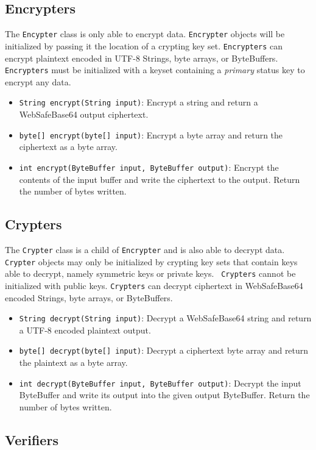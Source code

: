 \documentclass{llncs}
\begin{document}
\subsection{Encrypters}

The {\tt Encypter} class is only able to encrypt data. {\tt Encrypter} objects
will be initialized by passing it the location of a crypting key set.
{\tt Encrypters} can encrypt plaintext encoded in UTF-8 Strings, byte arrays, or
ByteBuffers. {\tt Encrypters} must be initialized with a keyset containing a
{\it primary} status key to encrypt any data.
\begin{itemize}
  \item {\tt String encrypt(String input)}: Encrypt a string and return a
  WebSafeBase64 output ciphertext.
  \item {\tt byte[] encrypt(byte[] input)}: Encrypt a byte array and return the
  ciphertext as a byte array.
  \item {\tt int encrypt(ByteBuffer input, ByteBuffer output)}: Encrypt the
  contents of the input buffer and write the ciphertext to the output. Return
  the number of bytes written.
\end{itemize}

\subsection{Crypters}

The {\tt Crypter} class is a child of {\tt Encrypter} and is also able to
decrypt data. {\tt Crypter} objects may only be initialized by crypting key sets
that contain keys able to decrypt, namely symmetric keys or private keys. {\tt
Crypters} cannot be initialized with public keys. {\tt Crypters} can decrypt
ciphertext in WebSafeBase64 encoded Strings, byte arrays, or ByteBuffers.
\begin{itemize}
  \item {\tt String decrypt(String input)}: Decrypt a WebSafeBase64 string and
  return a UTF-8 encoded plaintext output.
  \item {\tt byte[] decrypt(byte[] input)}: Decrypt a ciphertext byte array and
  return the plaintext as a byte array.
  \item {\tt int decrypt(ByteBuffer input, ByteBuffer output)}: Decrypt the
  input ByteBuffer and write its output into the given output ByteBuffer.
  Return the number of bytes written.
\end{itemize}

\subsection{Verifiers}
\end{document}
